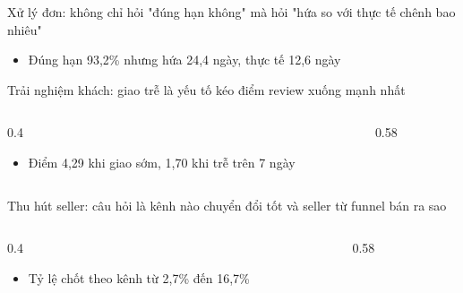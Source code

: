 \begin{frame}{Xử lý đơn: không chỉ hỏi "đúng hạn không" mà hỏi "hứa so với thực tế chênh bao nhiêu"}
\begin{itemize}
  \item Đúng hạn 93,2\% nhưng hứa 24,4 ngày, thực tế 12,6 ngày
\end{itemize}

\end{frame}

\begin{frame}{Trải nghiệm khách: giao trễ là yếu tố kéo điểm review xuống mạnh nhất}
\begin{columns}[T]\begin{column}{0.4\textwidth}
\begin{itemize}
  \item Điểm 4,29 khi giao sớm, 1,70 khi trễ trên 7 ngày
\end{itemize}
\end{column}\begin{column}{0.58\textwidth}
\begin{center}\end{center}
\end{column}\end{columns}

\end{frame}

\begin{frame}{Thu hút seller: câu hỏi là kênh nào chuyển đổi tốt và seller từ funnel bán ra sao}
\begin{columns}[T]\begin{column}{0.4\textwidth}
\begin{itemize}
  \item Tỷ lệ chốt theo kênh từ 2,7\% đến 16,7\%
\end{itemize}
\end{column}\begin{column}{0.58\textwidth}
\begin{center}\end{center}
\end{column}\end{columns}

\end{frame}


